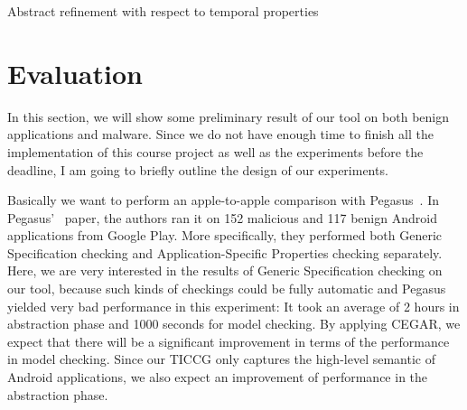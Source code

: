 \documentclass{article}
\begin{document}
\begin{algorithm}[!t]
\label{fig:alg}
\SetAlgoLined
{}
\caption{Abstract refinement with respect to temporal properties}\label{alg:abs}
\end{algorithm}


\section{Evaluation}
\label{sec:eval}
In this section, we will show some preliminary result of our tool on both benign
applications and malware. Since we do not have enough time to finish all the implementation of 
this course project as well as the experiments before the deadline, 
I am going to briefly outline the design of our experiments.

Basically we want to perform an apple-to-apple comparison with Pegasus~\cite{pegasus}.
In Pegasus'~\cite{pegasus} paper, the authors ran  it on 152 malicious and 117 benign 
Android applications from Google Play. More specifically, they performed both
Generic Specification checking and Application-Specific Properties checking separately.
Here, we are very interested in the results of Generic Specification checking on our
tool, because such kinds of checkings could be fully automatic and Pegasus~\cite{pegasus}
yielded very bad performance in this experiment: It took an average of 2 hours in
abstraction phase and 1000 seconds for model checking. By applying CEGAR, we expect that
there will be a significant improvement in terms of the performance in model checking.
Since our TICCG only captures the high-level semantic of Android applications, we also
expect an improvement of performance in the abstraction phase. 
\end{document}
